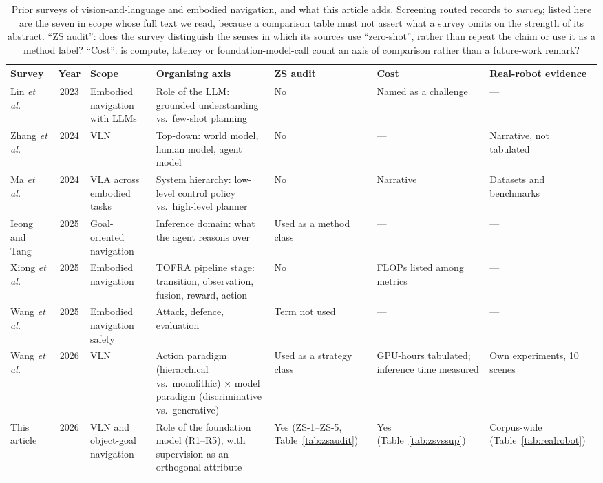 \documentclass[journal]{IEEEtran}
\begin{document}
\begin{table}[!t]
  \caption{Prior surveys of vision-and-language and embodied navigation, and
  what this article adds. Screening routed \ScrSurvey{} records to
  \emph{survey}; listed here are the seven in scope whose full text we read,
  because a comparison table must not assert what a survey omits on the
  strength of its abstract. ``ZS audit'': does the survey distinguish the
  senses in which its sources use ``zero-shot'', rather than repeat the claim
  or use it as a method label? ``Cost'': is compute, latency or
  foundation-model-call count an axis of comparison rather than a future-work
  remark?}
  \label{tab:surveys}
  \centering
  \footnotesize
  \setlength{\tabcolsep}{3.5pt}
  \begin{tabular}{@{}L{2.15cm}cL{2.0cm}L{3.85cm}L{2.25cm}L{2.05cm}L{2.55cm}@{}}
    \toprule
    Survey & Year & Scope & Organising axis & ZS audit & Cost & Real-robot
    evidence \\
    \midrule
    Lin \emph{et al.}~\cite{lin2023advances} & 2023 &
      Embodied navigation with LLMs &
      Role of the LLM: grounded understanding vs.\ few-shot planning &
      No & Named as a challenge & --- \\
    Zhang \emph{et al.}~\cite{zhang2024vision} & 2024 & VLN &
      Top-down: world model, human model, agent model &
      No & --- & Narrative, not tabulated \\
    Ma \emph{et al.}~\cite{ma2024survey} & 2024 &
      VLA across embodied tasks &
      System hierarchy: low-level control policy vs.\ high-level planner &
      No & Narrative & Datasets and benchmarks \\
    Ieong and Tang~\cite{ieong2025multimodal} & 2025 &
      Goal-oriented navigation &
      Inference domain: what the agent reasons over &
      Used as a method class & --- & --- \\
    Xiong \emph{et al.}~\cite{xiong2025sensing} & 2025 &
      Embodied navigation &
      TOFRA pipeline stage: transition, observation, fusion, reward, action &
      No & FLOPs listed among metrics & --- \\
    Wang \emph{et al.}~\cite{wang2025safety} & 2025 &
      Embodied navigation safety &
      Attack, defence, evaluation &
      Term not used & --- & --- \\
    Wang \emph{et al.}~\cite{wang2026comprehensive} & 2026 & VLN &
      Action paradigm (hierarchical vs.\ monolithic) $\times$ model paradigm
      (discriminative vs.\ generative) &
      Used as a strategy class & GPU-hours tabulated; inference time measured
      & Own experiments, 10 scenes \\
    \midrule
    This article & 2026 & VLN and object-goal navigation &
      Role of the foundation model (R1--R5), with supervision as an
      orthogonal attribute &
      Yes (ZS-1--ZS-5, Table~\ref{tab:zsaudit}) &
      Yes (Table~\ref{tab:zsvssup}) &
      Corpus-wide (Table~\ref{tab:realrobot}) \\
    \bottomrule
  \end{tabular}
\end{table}
\end{document}
